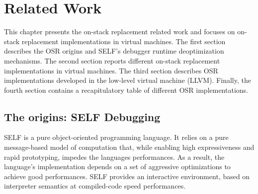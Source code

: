 
\chapter{Related Work} %

\label{Chapter3} %


\newcommand{\keyword}[1]{\textbf{#1}}
\newcommand{\tabhead}[1]{\textbf{#1}}
\newcommand{\code}[1]{\texttt{#1}}
\newcommand{\file}[1]{\texttt{\bfseries#1}}
\newcommand{\option}[1]{\texttt{\itshape#1}}

This chapter presents the on-stack replacement related work and focuses on on-stack replacement implementations in virtual machines.
The first section describes the OSR origins and SELF's debugger runtime deoptimization mechanisms.
The second section reports different on-stack replacement implementations in virtual machines.
The third section describes OSR implementations developed in the low-level virtual machine (LLVM). 
Finally, the fourth section contains a recapitulatory table of different OSR implementations.

\section{The origins: SELF Debugging}\label{SELF}
SELF is a pure object-oriented programming language.
It relies on a pure message-based model of computation that, while enabling high expressiveness and rapid prototyping, impedes the languages performances\cite{chambers1991making, holzle1991optimizing}.
As a result, the language's implementation depends on a set of aggressive optimizations to achieve good performances\cite{chambers1992design, holzle1992debugging}.
SELF provides an interactive environment, based on interpreter semantics at compiled-code speed performances.\\

